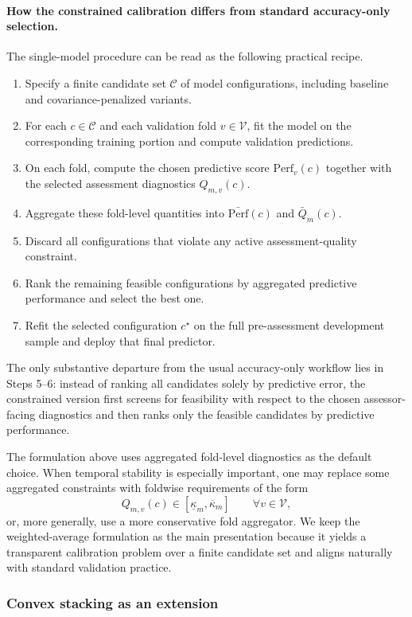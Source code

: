 \documentclass[12pt, draft]{article}
\theoremstyle{plain}
\theoremstyle{definition}
\newcommand{\1}{\mathbf{1}}
\begin{document}
\paragraph{How the constrained calibration differs from standard accuracy-only selection.}
The single-model procedure can be read as the following practical recipe.
\begin{enumerate}
    \item Specify a finite candidate set $\mathcal C$ of model configurations, including baseline and covariance-penalized variants.
    \item For each $c\in\mathcal C$ and each validation fold $v\in\mathcal V$, fit the model on the corresponding training portion and compute validation predictions.
    \item On each fold, compute the chosen predictive score $\mathrm{Perf}_v(c)$ together with the selected assessment diagnostics $Q_{m,v}(c)$.
    \item Aggregate these fold-level quantities into $\bar{\mathrm{Perf}}(c)$ and $\bar Q_m(c)$.
    \item Discard all configurations that violate any active assessment-quality constraint.
    \item Rank the remaining feasible configurations by aggregated predictive performance and select the best one.
    \item Refit the selected configuration $c^\star$ on the full pre-assessment development sample and deploy that final predictor.
\end{enumerate}
The only substantive departure from the usual accuracy-only workflow lies in Steps 5--6: instead of ranking all candidates solely by predictive error, the constrained version first screens for feasibility with respect to the chosen assessor-facing diagnostics and then ranks only the feasible candidates by predictive performance.

The formulation above uses aggregated fold-level diagnostics as the default choice. When temporal stability is especially important, one may replace some aggregated constraints with foldwise requirements of the form
\[
Q_{m,v}(c)\in[\underline{\kappa}_m,\overline{\kappa}_m]
\qquad
\forall v\in\mathcal V,
\]
or, more generally, use a more conservative fold aggregator. We keep the weighted-average formulation as the main presentation because it yields a transparent calibration problem over a finite candidate set and aligns naturally with standard validation practice.

\subsubsection{Convex stacking as an extension}
\label{subsubsec:convex_stacking}
\end{document}
